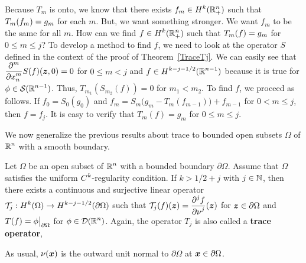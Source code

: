 Because $T_m$ is onto, we know that there exists
$\DS f_m \in H^k(\RR^n_+)$ such that $\DS T_m(f_m) = g_m$
for each $m$.  But, we want something stronger.  We want $f_m$ to be
the same for all $m$.  How can we find $\DS f \in H^k(\RR^n_+)$ such
that $\DS T_m(f) = g_m$ for $0 \leq m \leq j$?  To develop a
method to find $f$, we need to look at the operator $S$ defined in the
context of the proof of Theorem~\ref{TraceTj}.  We can easily see that
$\DS \pdfdxn{S(f)}{x_n}{m}(\VEC{z},0) = 0$ for $0 \leq m < j$
and $\DS f \in H^{k-j-1/2}(\RR^{n-1})$ because it is true
for $\DS \phi \in \SS(\RR^{n-1})$.
Thus, $T_{m_1}(S_{m_2}(f)) = 0$ for $m_1 < m_2$.  To find $f$, we
proceed as follows. If $f_0 = S_0(g_0)$ and
$f_m = S_m\big(g_m - T_m(f_{m-1})\big) + f_{m-1}$ for $0 < m \leq j$,
then $f = f_j$.  It is easy to verify that $T_m(f) = g_m$ for
$0 \leq m \leq j$.

We now generalize the previous results about trace to bounded open
subsets $\Omega$ of $\DS \RR^n$ with a smooth boundary.

\begin{theorem} \label{TraceTjOmega}
Let $\Omega$ be an open subset of $\DS \RR^n$ with a bounded boundary
$\partial \Omega$.  Assume that $\Omega$ satisfies the uniform
$\DS C^k$-regularity condition.  If $k > 1/2 +j$ with
$j \in \NN$, then there exists a continuous and surjective linear operator
$\DS \TT_j:H^k(\Omega) \to H^{k-j-1/2}(\partial \Omega)$ such
that $\DS \TT_j(f)(\VEC{z}) = \pdydxn{f}{\nu}{j}(\VEC{z})$ for
$\VEC{z} \in \partial \Omega$ and
$\DS T(f) = \phi\big|_{\partial \Omega}$ for
$\DS \phi \in \DD(\RR^n)$.
Again, the operator $T_j$ is also called a
{\bfseries trace operator},
\end{theorem}

\begin{rmk}
As usual, $\nu(\VEC{x})$ is the outward unit normal to $\partial \Omega$ at
$\VEC{x} \in \partial \Omega$.
\end{rmk}

